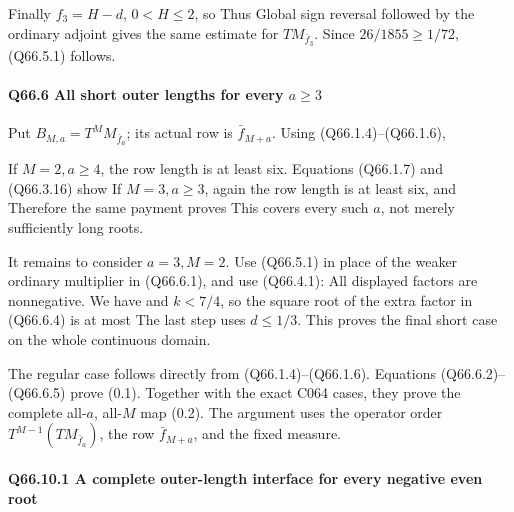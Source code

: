 Finally \(f_3=H-d\), \(0<H\le2\), so
Thus
Global sign reversal followed by the ordinary adjoint gives the
same estimate for \(T M_{\bar f_3}\). Since \(26/1855\ge1/72\),
(Q66.5.1) follows. 

\paragraph{Q66.6 All short outer lengths for every \(a\ge3\)}

Put \(B_{M,\allowbreak  a}=T^M M_{\bar f_a}\); its actual row is \(\bar f_{M+a}\).
Using (Q66.1.4)--(Q66.1.6),

If \(M=2,\allowbreak  a\ge4\), the row length is at least six. Equations
(Q66.1.7) and (Q66.3.16) show
If \(M=3,\allowbreak  a\ge3\), again the row length is at least six, and
Therefore the same payment proves
This covers every such \(a\), not merely sufficiently long roots.

It remains to consider \(a=3,\allowbreak  M=2\). Use (Q66.5.1) in place of the
weaker ordinary multiplier in (Q66.6.1), and use (Q66.4.1):
All displayed factors are nonnegative. We have
and \(k<7/4\), so the square root of the extra factor in (Q66.6.4)
is at most
The last step uses \(d\le1/3\).
This proves the final short case on the whole continuous domain.

The regular case follows directly from (Q66.1.4)--(Q66.1.6).
Equations (Q66.6.2)--(Q66.6.5) prove (0.1). Together with the exact
C064 cases, they prove the complete all-\(a\), all-\(M\) map (0.2).
The argument uses the operator order
\(T^{M-1}(T M_{\bar f_a})\), the row \(\bar f_{M+a}\), and the
fixed measure.


\paragraph{Q66.10.1 A complete outer-length interface for every negative even root}

